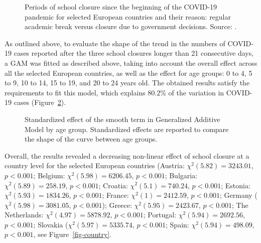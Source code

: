 \documentclass[Harvard,Times1COL]{WileyNJDv5}
\begin{document}
{\begin{figure}[h]
{}

\caption{\label{fig-descriptive}Periods of school closure since the
beginning of the COVID-19 pandemic for selected European countries and
their reason: regular academic break versus closure due to government
decisions. Source: \citet{unesco2022https}.}

\end{figure}%

As outlined above, to evaluate the shape of the trend in the numbers of
COVID-19 cases reported after the three school closures longer than 21
consecutive days, a GAM was fitted as described above, taking into
account the overall effect across all the selected European countries,
as well as the effect for age groups: 0 to 4, 5 to 9, 10 to 14, 15 to
19, and 20 to 24 years old. The obtained results satisfy the
requirements to fit this model, which explains 80.2\% of the variation
in COVID-19 cases (Figure~\ref{fig-age}).

\begin{figure}[h]


\caption{\label{fig-age}Standardized effect of the smooth term in
Generalized Additive Model by age group. Standardized effects are
reported to compare the shape of the curve between age groups.}

\end{figure}%

Overall, the results revealed a decreasing non-linear effect of school
closure at a country level for the selected European countries (Austria:
\(\chi^2(5.82) = 3243.01\), \(p < 0.001\); Belgium:
\(\chi^2(5.98) = 6206.45\), \(p < 0.001\); Bulgaria:
\(\chi^2(5.89) = 258.19\), \(p < 0.001\); Croatia:
\(\chi^2(5.1) = 740.24\), \(p < 0.001\); Estonia:
\(\chi^2(5.93) = 1834.26\), \(p < 0.001\); France:
\(\chi^2(1) = 2412.59\), \(p < 0.001\); Germany
(\(\chi^2(5.98) = 3081.05\), \(p < 0.001\)); Greece:
\(\chi^2(5.95) = 2423.67\), \(p < 0.001\); The Netherlands:
\(\chi^2(4.97) = 5878.92\), \(p < 0.001\); Portugal:
\(\chi^2(5.94) = 2692.56\), \(p < 0.001\); Slovakia
(\(\chi^2(5.97) = 5335.74\), \(p < 0.001\); Spain:
\(\chi^2(5.94) = 498.09\), \(p < 0.001\), see Figure~\ref{fig-country}.

}
\end{document}
